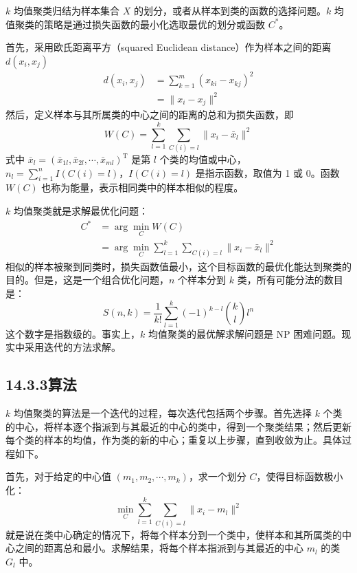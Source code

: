 \documentclass[UTF8,12pt,a4paper,fontset=fandol]{ctexart}
\begin{document}
$k$ 均值聚类归结为样本集合 $X$ 的划分，或者从样本到类的函数的选择问题。$k$ 均值聚类的策略是通过损失函数的最小化选取最优的划分或函数 $C^*$。

首先，采用欧氏距离平方（squared Euclidean distance）作为样本之间的距离 $d(x_i,x_j)$
\begin{equation}
\begin{aligned}
d(x_i,x_j)&=\sum_{k=1}^m (x_{ki}-x_{kj})^2\\
&=\|x_i-x_j\|^2
\end{aligned}
\tag{14.18}
\end{equation}
然后，定义样本与其所属类的中心之间的距离的总和为损失函数，即
\begin{equation}
W(C)=\sum_{l=1}^k\sum_{C(i)=l}\|x_i-\bar x_l\|^2
\tag{14.19}
\end{equation}
式中 $\bar x_l=(\bar x_{1l},\bar x_{2l},\cdots,\bar x_{ml})^{\mathrm{T}}$ 是第 $l$ 个类的均值或中心，$n_l=\sum_{i=1}^n I(C(i)=l)$，$I(C(i)=l)$ 是指示函数，取值为 1 或 0。函数 $W(C)$ 也称为能量，表示相同类中的样本相似的程度。

$k$ 均值聚类就是求解最优化问题：
\begin{equation}
\begin{aligned}
C^*&=\arg\min_C W(C)\\
&=\arg\min_C\sum_{l=1}^k\sum_{C(i)=l}\|x_i-\bar x_l\|^2
\end{aligned}
\tag{14.20}
\end{equation}
相似的样本被聚到同类时，损失函数值最小，这个目标函数的最优化能达到聚类的目的。但是，这是一个组合优化问题，$n$ 个样本分到 $k$ 类，所有可能分法的数目是：
\begin{equation}
S(n,k)=\frac{1}{k!}\sum_{l=1}^k(-1)^{k-l}\binom{k}{l}l^n
\tag{14.21}
\end{equation}
这个数字是指数级的。事实上，$k$ 均值聚类的最优解求解问题是 NP 困难问题。现实中采用迭代的方法求解。

\subsection*{14.3.3\quad 算法}

$k$ 均值聚类的算法是一个迭代的过程，每次迭代包括两个步骤。首先选择 $k$ 个类的中心，将样本逐个指派到与其最近的中心的类中，得到一个聚类结果；然后更新每个类的样本的均值，作为类的新的中心；重复以上步骤，直到收敛为止。具体过程如下。

首先，对于给定的中心值 $(m_1,m_2,\cdots,m_k)$，求一个划分 $C$，使得目标函数极小化：
\begin{equation}
\min_C\sum_{l=1}^k\sum_{C(i)=l}\|x_i-m_l\|^2
\tag{14.22}
\end{equation}
就是说在类中心确定的情况下，将每个样本分到一个类中，使样本和其所属类的中心之间的距离总和最小。求解结果，将每个样本指派到与其最近的中心 $m_l$ 的类 $G_l$ 中。
\end{document}

